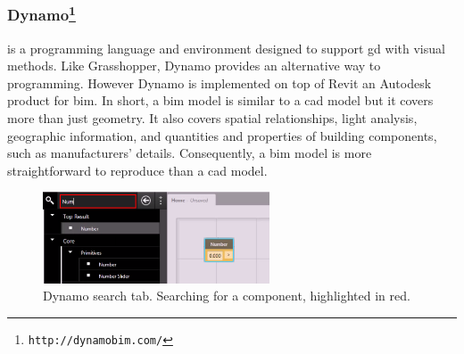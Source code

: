 \subsubsection{Dynamo\protect\footnote{\texttt{http://dynamobim.com/}}} is a programming language and environment designed to support \ac{gd} with visual methods. Like Grasshopper, Dynamo provides an alternative way to programming. However Dynamo is implemented on top of Revit an Autodesk product for \ac{bim}. In short, a \ac{bim} model is similar to a \ac{cad} model but it covers more than just geometry. It also covers spatial relationships, light analysis, geographic information, and quantities and properties of building components, such as manufacturers' details. Consequently, a \ac{bim} model is more straightforward to reproduce than a \ac{cad} model. 

\begin{figure}
  \vspace{-20pt}
  \begin{center}
    \includegraphics[width=0.6\textwidth]{img/dynam-tab}
  \end{center}
  \vspace{-15pt}
 \caption{Dynamo search tab. Searching for a component, highlighted in red.}  
  \vspace{-15pt}
    \label{fig:dynam}
\end{figure}

